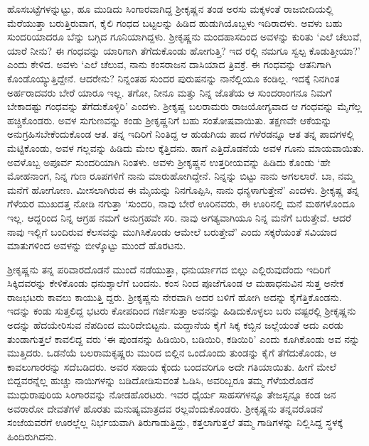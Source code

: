 ಹೊಸಬಟ್ಟೆಗಳನ್ನುಟ್ಟು, ಹೂ ಮುಡಿದು ಸಿಂಗಾರವಾಗಿದ್ದ ಶ್ರೀಕೃಷ್ಣನ ತಂಡ ಅರಸು ಮಕ್ಕಳಂತೆ ರಾಜಬೀದಿಯಲ್ಲಿ ಮೆರೆಯುತ್ತಾ ಬರುತ್ತಿರುವಾಗ, ಕೈಲಿ ಗಂಧದ ಬಟ್ಟಲನ್ನು ಹಿಡಿದ ಹುಡುಗಿಯೊಬ್ಬಳು ಇದಿರಾದಳು. ಅವಳು ಬಹು ಸುಂದರಿಯಾದರೂ ಬೆನ್ನು ಬಗ್ಗಿದ ಗೂನಿಯಾಗಿದ್ದಳು. ಶ್ರೀಕೃಷ್ಣನು ಮಂದಹಾಸದಿಂದ ಅವಳನ್ನು ಕುರಿತು ‘ಎಲೆ ಚೆಲುವೆ, ಯಾರೆ ನೀನು? ಈ ಗಂಧವನ್ನು ಯಾರಿಗಾಗಿ ತೆಗೆದುಕೊಂಡು ಹೋಗುತ್ತಿ? ಇದ ರಲ್ಲಿ ನಮಗೂ ಸ್ವಲ್ಪ ಕೊಡುತ್ತೀಯಾ?’ ಎಂದು ಕೇಳಿದ. ಅವಳು ‘ಎಲೆ ಚೆಲುವ, ನಾನು ಕಂಸರಾಜನ ದಾಸಿಯಾದ ತ್ರಿವಕ್ರೆ. ಈ ಗಂಧವನ್ನು ಆತನಿಗಾಗಿ ಕೊಂಡೊಯ್ಯುತ್ತಿದ್ದೇನೆ. ಆದರೇನು? ನಿನ್ನಂತಹ ಸುಂದರ ಪುರುಷನನ್ನು ನಾನೆಲ್ಲಿಯೂ ಕಂಡಿಲ್ಲ. ಇದಕ್ಕೆ ನಿನಗಿಂತ ಅರ್ಹರಾದವರು ಬೇರೆ ಯಾರೂ ಇಲ್ಲ. ತಗೋ, ನೀನೂ ಮತ್ತು ನಿನ್ನ ಜೊತೆಯ ಆ ಸುಂದರಾಂಗನೂ ನಿಮಗೆ ಬೇಕಾದಷ್ಟು ಗಂಧವನ್ನು ತೆಗೆದುಕೊಳ್ಳಿರಿ’ ಎಂದಳು. ಶ್ರೀಕೃಷ್ಣ ಬಲರಾಮರು ರಾಜಯೋಗ್ಯವಾದ ಆ ಗಂಧವನ್ನು ಮೈಗೆಲ್ಲ ಹಚ್ಚಿಕೊಂಡರು. ಅವಳ ಸುಗುಣವನ್ನು ಕಂಡು ಶ್ರೀಕೃಷ್ಣನಿಗೆ ಬಹು ಸಂತೋಷವಾಯಿತು. ತಕ್ಷಣವೇ ಆಕೆಯನ್ನು ಅನುಗ್ರಹಿಸಬೇಕೆಂದುಕೊಂಡ ಆತ. ತನ್ನ ಇದಿರಿಗೆ ನಿಂತಿದ್ದ ಆ ಹುಡುಗಿಯ ಪಾದ ಗಳೆರಡನ್ನೂ ಆತ ತನ್ನ ಪಾದಗಳಲ್ಲಿ ಮೆಟ್ಟಿಕೊಂಡು, ಅವಳ ಗಲ್ಲವನ್ನು ಹಿಡಿದು ಮೇಲ ಕ್ಕೆತ್ತಿದನು. ಹಾಗೆ ಎತ್ತಿದೊಡನೆಯೆ ಅವಳ ಗೂನು ಮಾಯವಾಯಿತು. ಅವಳೊಬ್ಬ ಅಪೂರ್ವ ಸುಂದರಿಯಾಗಿ ನಿಂತಳು. ಅವಳು ಶ್ರೀಕೃಷ್ಣನ ಉತ್ತರೀಯವನ್ನು ಹಿಡಿದು ಕೊಂಡು ‘ಹೇ ಮೋಹನಾಂಗ, ನಿನ್ನ ಗುಣ ರೂಪಗಳಿಗೆ ನಾನು ಮಾರುಹೋಗಿದ್ದೇನೆ. ನಿನ್ನನ್ನು ಬಿಟ್ಟು ನಾನು ಅಗಲಲಾರೆ. ಬಾ, ನಮ್ಮ ಮನೆಗೆ ಹೋಗೋಣ. ಮೀಸಲಾಗಿರುವ ಈ ಮೈಯನ್ನು ನಿನಗೊಪ್ಪಿಸಿ, ನಾನು ಧನ್ಯಳಾಗುತ್ತೇನೆ’ ಎಂದಳು. ಶ್ರೀಕೃಷ್ಣ ತನ್ನ ಗೆಳೆಯರ ಮುಖದತ್ತ ನೋಡಿ ನಗುತ್ತಾ ‘ಸುಂದರಿ, ನಾವು ಬೇರೆ ಊರಿನವರು, ಈ ಊರಿನಲ್ಲಿ ಮನೆ ಮಠಗಳೊಂದೂ ಇಲ್ಲ. ಆದ್ದರಿಂದ ನಿನ್ನ ಆಗ್ರಹ ನಮಗೆ ಅನುಗ್ರಹವೇ ಸರಿ. ನಾವು ಅಗತ್ಯವಾಗಿಯೂ ನಿನ್ನ ಮನೆಗೆ ಬರುತ್ತೇವೆ. ಆದರೆ ನಾವು ಇಲ್ಲಿಗೆ ಬಂದಿರುವ ಕೆಲಸವನ್ನು ಮುಗಿಸಿಕೊಂಡು ಆಮೇಲೆ ಬರುತ್ತೇವೆ’ ಎಂದು ಸಕ್ಕರೆಯಂತೆ ಸವಿಯಾದ ಮಾತುಗಳಿಂದ ಅವಳನ್ನು ಬೀಳ್ಕೊಟ್ಟು ಮುಂದೆ ಹೊರಟನು.

ಶ್ರೀಕೃಷ್ಣನು ತನ್ನ ಪರಿವಾರದೊಡನೆ ಮುಂದೆ ನಡೆಯುತ್ತಾ, ಧನುರ್ಯಾಗದ ಬಿಲ್ಲು ಎಲ್ಲಿರುವುದೆಂದು ಇದಿರಿಗೆ ಸಿಕ್ಕಿದವರನ್ನು ಕೇಳಿಕೊಂಡು ಧನುಶ್ಶಾಲೆಗೆ ಬಂದನು. ಕಂಸ ನಿಂದ ಪೂಜೆಗೊಂಡ ಆ ಮಹಾಧನುವಿನ ಸುತ್ತ ಅನೇಕ ರಾಜಭಟರು ಕಾವಲು ಕಾಯುತ್ತಿ ದ್ದರು. ಶ್ರೀಕೃಷ್ಣನು ನೇರವಾಗಿ ಅದರ ಬಳಿಗೆ ಹೋಗಿ ಅದನ್ನು ಕೈಗೆತ್ತಿಕೊಂಡನು. ಇದನ್ನು ಕಂಡು ಸುತ್ತಲಿದ್ದ ಭಟರು ಕೋಪದಿಂದ ಗರ್ಜಿಸುತ್ತಾ ಅವನನ್ನು ಹಿಡಿದುಕೊಳ್ಳಲು ಬರು ವಷ್ಟರಲ್ಲಿ ಶ್ರೀಕೃಷ್ಣನು ಅದನ್ನು ಹೆದಯೇರಿಸುವ ನೆಪದಿಂದ ಮುರಿದೇಬಿಟ್ಟನು. ಮದ್ದಾನೆಯ ಕೈಗೆ ಸಿಕ್ಕ ಕಬ್ಬಿನ ಜಲ್ಲೆಯಂತೆ ಅದು ಎರಡು ತುಂಡಾಗುತ್ತಲೆ ಕಾವಲಿದ್ದ ವರು ‘ಈ ಪುಂಡನನ್ನು ಹಿಡಿಯಿರಿ, ಬಡಿಯಿರಿ, ಕಡಿಯಿರಿ’ ಎಂದು ಕೂಗಿಕೊಂಡು ಅವ ನನ್ನು ಮುತ್ತಿದರು. ಒಡನೆಯೆ ಬಲರಾಮಕೃಷ್ಣರು ಮುರಿದ ಬಿಲ್ಲಿನ ಒಂದೊಂದು ತುಂಡನ್ನು ಕೈಗೆ ತೆಗೆದುಕೊಂಡು, ಆ ಕಾವಲುಗಾರರನ್ನು ಸದೆಬಡಿದರು. ಅವರ ಸಹಾಯ ಕ್ಕೆಂದು ಬಂದವರಿಗೂ ಅದೇ ಗತಿಯಾಯಿತು. ಹೀಗೆ ಮೇಲೆ ಬಿದ್ದವರನ್ನೆಲ್ಲ ಹುಚ್ಚು ನಾಯಿಗಳನ್ನು ಬಡಿದೋಡಿಸುವಂತೆ ಓಡಿಸಿ, ಅವರಿಬ್ಬರೂ ತಮ್ಮ ಗೆಳೆಯರೊಡನೆ ಮುಧುರಾಪುರಿಯ ಸಿಂಗಾರವನ್ನು ನೋಡಹೊರಟರು. ಇವರ ಧೈರ್ಯ ಸಾಹಸಗಳನ್ನೂ ತೇಜಸ್ಸನ್ನೂ ಕಂಡ ಜನ ಅವರಾರೋ ದೇವತೆಗಳೆ ಹೊರತು ಮನುಷ್ಯಮಾತ್ರದವ ರಲ್ಲವೆಂದುಕೊಂಡರು. ಶ್ರೀಕೃಷ್ಣನು ತನ್ನವರೊಡನೆ ಸಂಜೆಯವರೆಗೆ ಊರಲ್ಲೆಲ್ಲ ನಿರ್ಭಯವಾಗಿ ತಿರುಗಾಡುತ್ತಿದ್ದು, ಕತ್ತಲಾಗುತ್ತಲೆ ತಮ್ಮ ಗಾಡಿಗಳನ್ನು ನಿಲ್ಲಿಸಿದ್ದ ಸ್ಥಳಕ್ಕೆ ಹಿಂದಿರುಗಿದನು.

